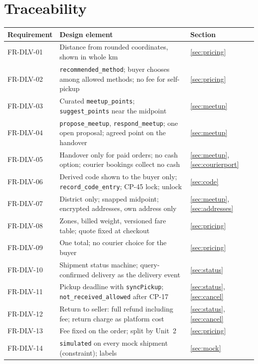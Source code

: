 \documentclass[11pt,a4paper]{article}
\begin{document}
\section{Traceability}
\label{app:trace}
{\small\begin{longtable}{@{}>{\ttfamily}p{2.4cm}>{\raggedright\arraybackslash}p{10.6cm}>{\raggedright\arraybackslash}p{2.2cm}@{}}
\toprule \textnormal{\textbf{Requirement}} & \textbf{Design element} & \textbf{Section} \\ \midrule \endhead
FR-DLV-01 & Distance from rounded coordinates, shown in whole km & \ref{sec:pricing} \\
FR-DLV-02 & \texttt{recommended\_method}; buyer chooses among allowed methods; no fee for self-pickup & \ref{sec:pricing} \\
FR-DLV-03 & Curated \texttt{meetup\_points}; \texttt{suggest\_points} near the midpoint & \ref{sec:meetup} \\
FR-DLV-04 & \texttt{propose\_meetup}, \texttt{respond\_meetup}; one open proposal; agreed point on the handover & \ref{sec:meetup} \\
FR-DLV-05 & Handover only for paid orders; no cash option; courier bookings collect no cash & \ref{sec:meetup}, \ref{sec:courierport} \\
FR-DLV-06 & Derived code shown to the buyer only; \texttt{record\_code\_entry}; CP-45 lock; unlock & \ref{sec:code} \\
FR-DLV-07 & District only; snapped midpoint; encrypted addresses, own address only & \ref{sec:meetup}, \ref{sec:addresses} \\
FR-DLV-08 & Zones, billed weight, versioned fare table; quote fixed at checkout & \ref{sec:pricing} \\
FR-DLV-09 & One total; no courier choice for the buyer & \ref{sec:pricing} \\
FR-DLV-10 & Shipment status machine; query-confirmed delivery as the delivery event & \ref{sec:status} \\
FR-DLV-11 & Pickup deadline with \texttt{syncPickup}; \texttt{not\_received\_allowed} after CP-17 & \ref{sec:status}, \ref{sec:cancel} \\
FR-DLV-12 & Return to seller: full refund including fee; return charge as platform cost & \ref{sec:status}, \ref{sec:cancel} \\
FR-DLV-13 & Fee fixed on the order; split by Unit~2 & \ref{sec:pricing} \\
FR-DLV-14 & \texttt{simulated} on every mock shipment (constraint); labels & \ref{sec:mock} \\

\end{longtable}}
\end{document}
